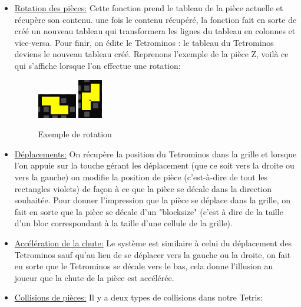 \documentclass[a4paper, 11pt]{article}
\begin{document}
\begin{itemize}
\begin{itemize}
            		\item \underline{Rotation des pièces:} %
            		Cette fonction prend le tableau de la pièce actuelle et récupère son contenu. une fois le contenu récupéré, la fonction fait en sorte de créé un nouveau tableau qui transformera les lignes du tableau en colonnes et vice-versa. Pour finir, on édite le Tetrominos : le tableau du Tetrominos deviens le nouveau tableau créé.
    				\newline
    				Reprenons l'exemple de la pièce Z, voilà ce qui s'affiche lorsque l'on effectue une rotation:
    				
    				\begin{figure}[ht]
                		\centering
                			\includegraphics[scale=1.2]{images/CapturePiece.png}   
                			\includegraphics[scale=1.2]{images/rotat.png}
                		\caption{Exemple de rotation}
            		\end{figure}
            		
            		\item \underline{Déplacements:} %
            		On récupère la position du Tetrominos dans la grille et lorsque l'on appuie sur la touche gérant les déplacement (que ce soit vers la droite ou vers la gauche) on modifie la position de pièce (c'est-à-dire de tout les rectangles violets) de façon à ce que la pièce se décale dans la direction souhaitée. 
    				\newline
    				Pour donner l'impression que la pièce se déplace dans la grille, on fait en sorte que la pièce se décale d'un "blocksize" (c'est à dire de la taille d'un bloc correspondant à la taille d'une cellule de la grille).
            		\newline
            		\item \underline{Accélération de la chute:} %
            		Le système est similaire à celui du déplacement des Tetrominos sauf qu'au lieu de se déplacer vers la gauche ou la droite, on fait en sorte que le Tetrominos se décale vers le bas, cela donne l'illusion au joueur que la chute de la pièce est accélérée.
    				\newline
            		\item \underline {Collisions de pièces:} Il y a deux types de collisions dans notre Tetris:
    				\newline
    				

\end{itemize}
\end{itemize}
\end{document}
